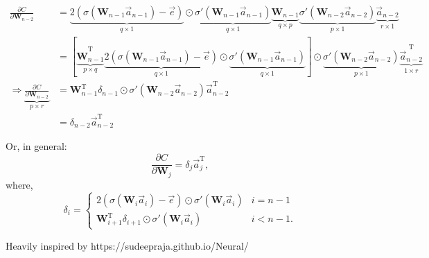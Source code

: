 \begin{align*}
\frac{\partial C}{\partial \mathbf{W}_{n-2}} &=
\underbrace{2(\sigma(\mathbf{W}_{n-1}\vec{a}_{n-1})-\vec{e})}_{q \times 1}
\odot 
\underbrace{\sigma'(\mathbf{W}_{n-1}\vec{a}_{n-1})}_{q \times 1}
\underbrace{\mathbf{W}_{n-1}}_{q \times p}
\underbrace{\sigma'(\mathbf{W}_{n-2}\vec{a}_{n-2})}_{p \times 1}
\underbrace{\vec{a}_{n-2}}_{r \times 1} \\
&=
\left[ \underbrace{\mathbf{W}_{n-1}}_{p \times q}^{\text{T}}
\underbrace{2(\sigma(\mathbf{W}_{n-1}\vec{a}_{n-1})-\vec{e})}_{q \times 1}
\odot 
\underbrace{\sigma'(\mathbf{W}_{n-1}\vec{a}_{n-1})}_{q \times 1} \right]
\odot
\underbrace{\sigma'(\mathbf{W}_{n-2}\vec{a}_{n-2})}_{p \times 1}
\underbrace{\vec{a}_{n-2}}_{1 \times r}^{\text{T}} \\
\Rightarrow
\underbrace{\frac{\partial C}{\partial \mathbf{W}_{n-2}}}_{p \times r} &=
\mathbf{W}_{n-1}^{\text{T}}\delta_{n-1}\odot \sigma'(\mathbf{W}_{n-2}\vec{a}_{n-2})
\vec{a}_{n-2}^{\text{T}} \\
&= \delta_{n-2}\vec{a}_{n-2}^{\text{T}}
\end{align*}

Or, in general:
$$\frac{\partial C}{\partial \mathbf{W}_{j}} = \delta_{j}\vec{a}_{j}^{\text{T}},$$
where,
$$\delta_{i}=\begin{cases} 2(\sigma(\mathbf{W}_i\vec{a}_i) - \vec{e})\odot\sigma'(\mathbf{W}_i \vec{a}_i) & i=n-1 \\
\mathbf{W}_{i+1}^{\text{T}}\delta_{i+1}\odot\sigma'(\mathbf{W}_i\vec{a}_i) & i<n-1.
\end{cases}$$


Heavily inspired by https://sudeepraja.github.io/Neural/